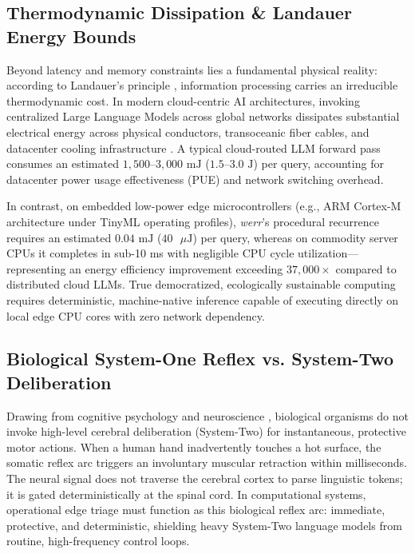 \documentclass[10pt,journal,compsoc,twocolumn]{article}
\begin{document}
\subsection{Thermodynamic Dissipation \& Landauer Energy Bounds}
Beyond latency and memory constraints lies a fundamental physical reality: according to Landauer's principle \cite{landauer1961irreversibility}, information processing carries an irreducible thermodynamic cost. In modern cloud-centric AI architectures, invoking centralized Large Language Models across global networks dissipates substantial electrical energy across physical conductors, transoceanic fiber cables, and datacenter cooling infrastructure \cite{strubell2019energy}. A typical cloud-routed LLM forward pass consumes an estimated $1,500\text{--}3,000\text{ mJ}$ ($1.5\text{--}3.0\text{ J}$) per query, accounting for datacenter power usage effectiveness (PUE) and network switching overhead. 

In contrast, on embedded low-power edge microcontrollers (e.g., ARM Cortex-M architecture under TinyML operating profiles), \textit{werr}'s procedural recurrence requires an estimated $0.04\text{ mJ}$ ($40\text{ }\mu\text{J}$) per query, whereas on commodity server CPUs it completes in sub-10 ms with negligible CPU cycle utilization---representing an energy efficiency improvement exceeding $37,000\times$ compared to distributed cloud LLMs. True democratized, ecologically sustainable computing requires deterministic, machine-native inference capable of executing directly on local edge CPU cores with zero network dependency.

\subsection{Biological System-One Reflex vs. System-Two Deliberation}
Drawing from cognitive psychology and neuroscience \cite{kahneman2011thinking}, biological organisms do not invoke high-level cerebral deliberation (System-Two) for instantaneous, protective motor actions. When a human hand inadvertently touches a hot surface, the somatic reflex arc triggers an involuntary muscular retraction within milliseconds. The neural signal does not traverse the cerebral cortex to parse linguistic tokens; it is gated deterministically at the spinal cord. In computational systems, operational edge triage must function as this biological reflex arc: immediate, protective, and deterministic, shielding heavy System-Two language models from routine, high-frequency control loops.
\end{document}
